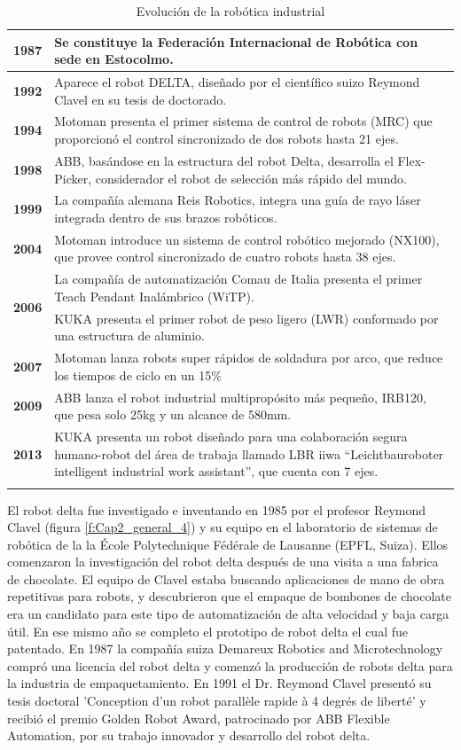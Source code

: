 \begin{longtable}[c]{c m{12cm}}
     \textbf{1987} & Se constituye la Federación Internacional de Robótica con sede en Estocolmo. \\ \hline
     \textbf{1992} & Aparece el robot DELTA, diseñado por el científico suizo Reymond Clavel en su tesis de doctorado. \\ \hline
     \textbf{1994} & Motoman presenta el primer sistema de control de robots (MRC) que proporcionó el control sincronizado de dos robots hasta 21 ejes. \\ \hline
     \textbf{1998} & ABB, basándose en la estructura del robot Delta, desarrolla el Flex-Picker, considerador el robot de selección más rápido del mundo. \\ \hline
     \textbf{1999} & La compañía alemana Reis Robotics, integra una guía de rayo láser integrada dentro de sus brazos robóticos. \\ \hline
     \textbf{2004} & Motoman introduce un sistema de control robótico mejorado (NX100), que provee control sincronizado de cuatro robots hasta 38 ejes. \\ \hline
     \multirow{2}{*}{\textbf{2006}} & La compañía de automatización Comau de Italia presenta el primer Teach Pendant Inalámbrico (WiTP). \\ \cline{2-2}
        & KUKA presenta el primer robot de peso ligero (LWR) conformado por una estructura de aluminio. \\ \hline
     \textbf{2007} & Motoman lanza robots super rápidos de soldadura por arco, que reduce los tiempos de ciclo en un 15\% 
     \\ \hline
     \textbf{2009} &  ABB lanza el robot industrial multipropósito más pequeño, IRB120, que pesa solo 25kg y un alcance de 580mm. \\ \hline
     \textbf{2013} & KUKA presenta un robot diseñado para una colaboración segura humano-robot del área de trabaja llamado LBR iiwa “Leichtbauroboter intelligent industrial work assistant”, que cuenta con 7 ejes. \\ \hline
    \caption{Evolución de la robótica industrial}
 \end{longtable}
 
    El robot delta fue investigado e inventando en 1985 por el profesor Reymond Clavel (figura \ref{f:Cap2_general_4}) y su equipo en el laboratorio de sistemas de robótica de la la École Polytechnique Fédérale de Lausanne (EPFL, Suiza). Ellos comenzaron la investigación del robot delta después de una visita a una fabrica de chocolate. El equipo de Clavel estaba buscando aplicaciones de mano de obra repetitivas para robots, y descubrieron que el empaque de bombones de chocolate era un candidato para este tipo de automatización de alta velocidad y baja carga útil. En ese mismo año se completo el prototipo de robot delta el cual fue patentado. En 1987 la compañía suiza Demareux Robotics and Microtechnology compró una licencia del robot delta y comenzó la producción de robots delta para la industria de empaquetamiento. En 1991 el Dr. Reymond Clavel presentó su tesis doctoral 'Conception d'un robot parallèle rapide à 4 degrés de liberté' y recibió el premio Golden Robot Award, patrocinado por ABB Flexible Automation, por su trabajo innovador y desarrollo del robot delta.


